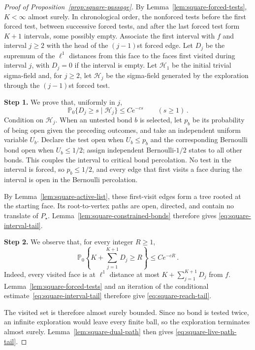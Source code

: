 \documentclass[11pt]{amsart}
\theoremstyle{plain}
\theoremstyle{definition}
\renewcommand{\P}{\mathbb P}
\begin{document}
	\begin{proof}[Proof of Proposition~\ref{prop:square-passage}]
		By Lemma~\ref{lem:square-forced-tests}, $K<\infty$ almost surely.  In
		chronological order, the nonforced tests before the first forced test, between
		successive forced tests, and after the last forced test form $K+1$ intervals,
		some possibly empty.  Associate the first interval with $f$ and interval $j\geq2$
		with the head of the $(j-1)$st forced edge.  Let $D_j$ be the supremum of the
		$\ell^1$ distances from this face to the faces first visited during interval
		$j$, with $D_j=0$ if the interval is empty.  Let $\mathcal H_1$ be the initial
		trivial sigma-field and, for $j\geq2$, let $\mathcal H_j$ be the sigma-field
		generated by the exploration through the $(j-1)$st forced test.

		\noindent\textbf{Step 1.}  We prove that, uniformly in $j$,
		\begin{equation}\label{eq:square-interval-tail}
			\P_0\{D_j\geq s\mid\mathcal H_j\}\leq Ce^{-cs}
			\qquad (s\geq1)\, .
		\end{equation}
		Condition on $\mathcal H_j$.  When an untested bond $b$ is selected, let $p_b$
		be its probability of being open given the preceding outcomes, and take an
		independent uniform variable $U_b$.  Declare the test open when $U_b\leq p_b$
		and the corresponding Bernoulli bond open when $U_b\leq1/2$; assign independent
		Bernoulli-$1/2$ states to all other bonds.  This couples the interval to critical
		bond percolation.  No test in the interval is forced, so $p_b\leq1/2$, and every
		edge that first visits a face during the interval is open in the Bernoulli
		percolation.

		By Lemma~\ref{lem:square-active-list}, these first-visit edges form a tree rooted
		at the starting face.  Its root-to-vertex paths are open, directed, and contain
		no translate of $P_\star$.  Lemma~\ref{lem:square-constrained-bonds} therefore
		gives \eqref{eq:square-interval-tail}.



		\noindent\textbf{Step 2.}  We observe that, for every integer $R\geq1$,
		\begin{equation}\label{eq:square-reach-tail}
			\P_0\left\{K+\sum_{j=1}^{K+1}D_j\geq R\right\}\leq Ce^{-cR}\, .
		\end{equation}
		Indeed, every visited face is at $\ell^1$ distance at most
		$K+\sum_{j=1}^{K+1}D_j$ from $f$.  Lemma~\ref{lem:square-forced-tests}
		and an iteration of the conditional estimate~\eqref{eq:square-interval-tail} therefore give
		\eqref{eq:square-reach-tail}.

		The visited set is therefore almost surely bounded.  Since no bond is tested
		twice, an infinite exploration would leave every finite ball, so the
		exploration terminates almost surely. Lemma~\ref{lem:square-dual-path} then gives
		\eqref{eq:square-live-path-tail}.
	\end{proof}
\end{document}

